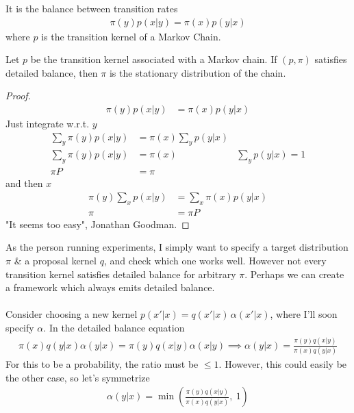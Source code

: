 \begin{definition}
	 It is the balance between transition rates
	\begin{align}
		\pi(y) p(x | y) = \pi(x) p(y | x)
	\end{align}
	where $p$ is the transition kernel of a Markov Chain.
\end{definition}
\begin{fact}
	Let $p$ be the transition kernel associated with a Markov chain. If  $(p, \pi)$ satisfies detailed balance, then $\pi$ is the stationary distribution of the chain.
\end{fact}
\begin{proof}
	\begin{align}
		\pi(y) p(x|y) & = \pi(x) p(y|x)
	\end{align}
	Just integrate w.r.t. $y$	\begin{align}
		\sum_y \pi(y) p(x|y) & = \pi(x) \sum_y p(y|x)\\
		\sum_y \pi(y) p(x|y) & = \pi(x)& \sum_y p(y| x) = 1\\
		\pi P & = \pi 
	\end{align}
	and then $x$
	\begin{align}
		\pi(y) \sum_x p(x| y) & = \sum_x \pi(x) p(y|x)\\
		\pi& = \pi P
	\end{align}
	"It seems too easy", Jonathan Goodman.
\end{proof}
As the person running experiments, I simply want to specify a target distribution $\pi$ \& a proposal kernel $q$, and check which one works well. However not every transition kernel satisfies detailed balance for arbitrary $\pi$. Perhaps we can create a framework which always emits detailed balance.\\
\\
Consider choosing a new kernel $p(x' | x) = q(x' | x)\, \alpha(x' |x)$, where I'll soon specify $\alpha$. In the detailed balance equation
\begin{align}
	\pi(x) q(y|x) \alpha(y |x) = \pi(y) q(x | y) \alpha(x|y) \implies \alpha(y|x) = \frac{\pi(y) q(x|y)}{\pi(x) q(y | x)}
\end{align}
For this to be a probability, the ratio must be $\leq 1$. However, this could easily be the other case, so let's symmetrize
\begin{align}
	\alpha(y | x) = \min \left( \frac{\pi(y) q(x | y)}{\pi(x) q(y | x)}, \ 1 \right)
\end{align}


